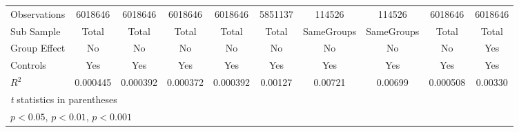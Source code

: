 {\begin{tabular}{l*{9}{c}}
\hline
Observations    &  6018646         &  6018646         &  6018646         &  6018646         &  5851137         &   114526         &   114526         &  6018646         &  6018646         \\
Sub Sample      &    Total         &    Total         &    Total         &    Total         &    Total         &SameGroups         &SameGroups         &    Total         &    Total         \\
Group Effect    &       No         &       No         &       No         &       No         &       No         &       No         &       No         &       No         &      Yes         \\
Controls        &      Yes         &      Yes         &      Yes         &      Yes         &      Yes         &      Yes         &      Yes         &      Yes         &      Yes         \\
$ R^2 $         & 0.000445         & 0.000392         & 0.000372         & 0.000392         &  0.00127         &  0.00721         &  0.00699         & 0.000508         &  0.00330         \\
\hline\hline
\multicolumn{10}{l}{\footnotesize \textit{t} statistics in parentheses}\\
\multicolumn{10}{l}{\footnotesize \sym{*} \(p<0.05\), \sym{**} \(p<0.01\), \sym{***} \(p<0.001\)}\\
\end{tabular}
}
